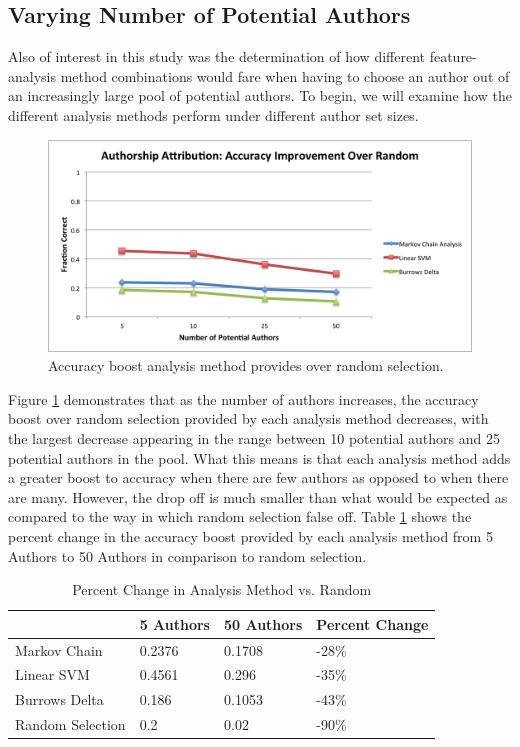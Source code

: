 \documentclass[pageno]{jpaper}
\begin{document}
\subsection{Varying Number of Potential Authors}
\label{sec:resultsVaryAuthors}
Also of interest in this study was the determination of how different feature-analysis method combinations would fare when having to choose an author out of an increasingly large pool of potential authors.  To begin, we will examine how the different analysis methods perform under different author set sizes.  
\begin{figure}[h!]
\begin{center}
\includegraphics*[scale=.85]{GeneralVaryAuthorImprovementOverRandom}
\end{center}
\caption{Accuracy boost analysis method provides over random selection.}
\label{fig:GeneralVaryingAuthorImprovement}
\end{figure}
Figure \ref{fig:GeneralVaryingAuthorImprovement} demonstrates that as the number of authors increases, the accuracy boost over random selection provided by each analysis method decreases, with the largest decrease appearing in the range between 10 potential authors and 25 potential authors in the pool.  What this means is that each analysis method adds a greater boost to accuracy when there are few authors as opposed to when there are many.  However, the drop off is much smaller than what would be expected as compared to the way in which random selection false off. Table \ref{percent-change} shows the percent change in the accuracy boost provided by each analysis method from 5 Authors to 50 Authors in comparison to random selection.
\begin{table}[h!]
\centering
\begin{tabular}{|l|l|l|l|}
\hline
                 & 5 Authors & 50 Authors & Percent Change \\ \hline
Markov Chain     & 0.2376    & 0.1708     & -28\%          \\ \hline
Linear SVM       & 0.4561    & 0.296      & -35\%          \\ \hline
Burrows Delta    & 0.186     & 0.1053     & -43\%          \\ \hline
Random Selection & 0.2       & 0.02       & -90\%          \\ \hline
\end{tabular}
\caption{Percent Change in Analysis Method vs. Random}
\label{percent-change}
\end{table}
\end{document}
